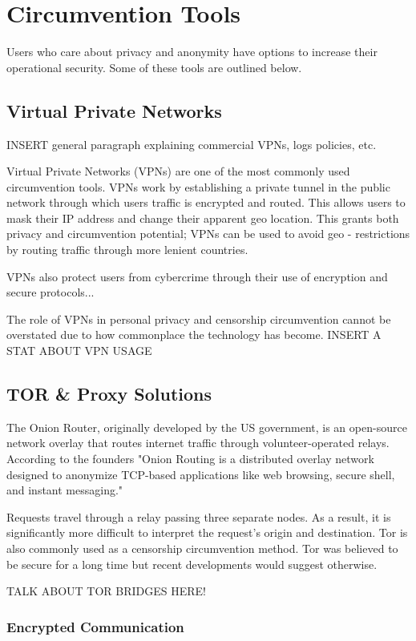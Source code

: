 \chapter{Circumvention Tools}

Users who care about privacy and anonymity have options to increase their operational security. Some of these tools are outlined below.

\section{Virtual Private Networks}

INSERT general paragraph explaining commercial VPNs, logs policies, etc.

Virtual Private Networks (VPNs) are one of the most commonly used circumvention tools. VPNs work by establishing a private tunnel in the public network through which users traffic is encrypted and routed. This allows users to mask their IP address and change their apparent geo location. This grants both privacy and circumvention potential; VPNs can be used to avoid geo - restrictions by routing traffic through more lenient countries. 

VPNs also protect users from cybercrime through their use of encryption and secure protocols...

The role of VPNs in personal privacy and censorship circumvention cannot be overstated due to how commonplace the technology has become. INSERT A STAT ABOUT VPN USAGE



\section{TOR \& Proxy Solutions}

The Onion Router, originally developed by the US government, is an open-source network overlay that routes internet traffic through volunteer-operated relays. According to the founders "Onion Routing is a distributed overlay network designed to anonymize TCP-based applications like web browsing, secure shell, and instant messaging."\cite{dingledine2004tor}

Requests travel through a relay passing three separate nodes. As a result, it is significantly more difficult to interpret the request’s origin and destination. Tor is also commonly used as a censorship circumvention method. Tor was believed to be secure for a long time but recent developments would suggest otherwise. \cite{tor_not_secure}

TALK ABOUT TOR BRIDGES HERE!

\subsection{Encrypted Communication}



